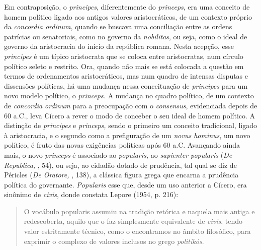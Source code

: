 Em contraposição, o \emph{principes}, diferentemente do \emph{princeps},
era uma conceito de homem político ligado aos antigos valores
aristocráticos, de um contexto próprio da \emph{concordia ordinum},
quando se buscava uma conciliação entre as ordens patrícias ou
senatoriais, como no governo da \emph{nobilitas}, ou seja, como o ideal
de governo da aristocracia do início da república romana. Nesta acepção,
esse \emph{principes} é um típico aristocrata que se coloca entre
aristocratas, num círculo político seleto e restrito. Ora, quando não
mais se está colocada a questão em termos de ordenamentos
aristocráticos, mas num quadro de intensas disputas e dissensões
políticas, há uma mudança nessa conceituação de \emph{principes} para um
novo modelo político, o \emph{princeps.} A mudança no quadro político,
de um contexto de \emph{concordia ordinum} para a preocupação com o
\emph{consensus}, evidenciada depois de 60 a.C., leva Cícero a rever o
modo de conceber o seu ideal de homem político. A distinção de
\emph{principes} e \emph{princeps,} sendo o primeiro um conceito
tradicional, ligado à aristocracia, e o segundo como a prefiguração de
um \emph{novus hominus}, um novo político, é fruto das novas exigências
políticas após 60 a.C. Avançando ainda mais, o novo \emph{princeps} é
associado ao \emph{popularis,} ao \emph{sapienter popularis} (\emph{De
Republica,} , 54), ou seja, ao cidadão dotado de prudência, tal qual
se diz de Péricles (\emph{De Oratore,} , 138), a clássica figura
grega que encarna a prudência política do governante. \emph{Popularis}
esse que, desde um uso anterior a Cícero, era sinônimo de \emph{civis},
donde constata Lepore (1954, p. 216):

\begin{quote}
O vocábulo popularis assumiu na tradição retórica e naquela mais
antiga e redescoberta, aquilo que o faz simplesmente equivalente de
\emph{civis}, tendo valor estritamente técnico, como o encontramos no
âmbito filosófico, para exprimir o complexo de valores inclusos no
grego \emph{politikós}.
\end{quote}

